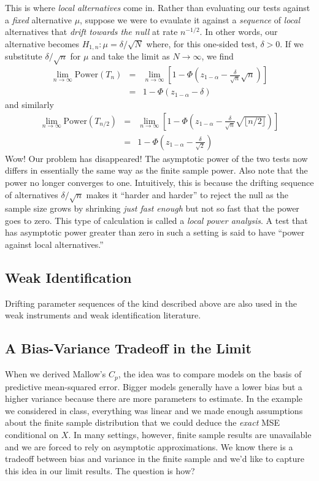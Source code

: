 This is where \emph{local alternatives} come in.
Rather than evaluating our tests against a \emph{fixed} alternative $\mu$, suppose we were to evaulate it against a \emph{sequence} of \emph{local} alternatives that \emph{drift towards the null} at rate $n^{-1/2}$. 
In other words, our alternative becomes $H_{1,n} \colon \mu = \delta / \sqrt{N}$ where, for this one-sided test, $\delta > 0$. 
If we substitute $\delta/\sqrt{n}$ for $\mu$ and take the limit as $N\rightarrow \infty$, we find
\begin{eqnarray*}
\lim_{n\rightarrow \infty} \mbox{Power}(T_{n}) &=& \lim_{n\rightarrow \infty}\left[1 - \Phi\left(z_{1-\alpha} - \frac{\delta}{\sqrt{n}}\sqrt{n}\right) \right]\\
&=& 1 - \Phi\left(z_{1-\alpha} - \delta \right)
\end{eqnarray*}
and similarly
\begin{eqnarray*}
\lim_{n\rightarrow \infty} \mbox{Power}(T_{n/2}) &=& \lim_{n\rightarrow \infty}\left[1 - \Phi\left(z_{1-\alpha} - \frac{\delta}{\sqrt{n}}\sqrt{\lfloor n/2 \rfloor }\right) \right]\\
&=& 1 - \Phi\left(z_{1-\alpha} - \frac{\delta}{\sqrt{2}} \right)
\end{eqnarray*}
Wow! Our problem has disappeared! 
The asymptotic power of the two tests now differs in essentially the same way as the finite sample power. 
Also note that the power no longer converges to one.
Intuitively, this is because the drifting sequence of alternatives $\delta/\sqrt{n}$ makes it ``harder and harder'' to reject the null as the sample size grows by shrinking \emph{just fast enough} but not so fast that the power goes to zero. 
This type of calculation is called a \emph{local power analysis}. 
A test that has asymptotic power greater than zero in such a setting is said to have ``power against local alternatives.''


\subsection{Weak Identification}
Drifting parameter sequences of the kind described above are also used in the weak instruments and weak identification literature.

\subsection{A Bias-Variance Tradeoff in the Limit}
When we derived Mallow's $C_p$, the idea was to compare models on the basis of predictive mean-squared error. 
Bigger models generally have a lower bias but a higher variance because there are more parameters to estimate. 
In the example we considered in class, everything was linear and we made enough assumptions about the finite sample distribution that we could deduce the \emph{exact} MSE conditional on $X$. 
In many settings, however, finite sample results are unavailable and we are forced to rely on asymptotic approximations. 
We know there is a tradeoff between bias and variance in the finite sample and we'd like to capture this idea in our limit results. 
The question is how?

